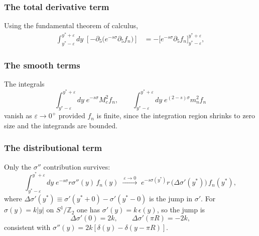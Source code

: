 \documentclass[11pt]{article}
\begin{document}
\subsubsection*{The total derivative term}
Using the fundamental theorem of calculus,
\begin{align}
\int_{y^\ast-\varepsilon}^{y^\ast+\varepsilon}\!\!dy\;
\left[-\partial_5\!\big(e^{-s\sigma}\partial_5 f_n\big)\right]
&=-\Big[e^{-s\sigma}\partial_5 f_n\Big]_{y^\ast-\varepsilon}^{y^\ast+\varepsilon},
\label{eq:jump-term}
\end{align}

\subsubsection*{The smooth terms}
The integrals
\[
\int_{y^\ast-\varepsilon}^{y^\ast+\varepsilon}\!\!dy\; e^{-s\sigma} M_c^2 f_n,
\qquad
\int_{y^\ast-\varepsilon}^{y^\ast+\varepsilon}\!\!dy\; e^{(2-s)\sigma} m_n^2 f_n
\]
vanish as $\varepsilon\to 0^+$ provided $f_n$ is finite, since the integration region shrinks to
zero size and the integrands are bounded.

\subsubsection*{The distributional term}
Only the $\sigma''$ contribution survives:
\begin{equation}
\int_{y^\ast-\varepsilon}^{y^\ast+\varepsilon}\!\!dy\; e^{-s\sigma} r\sigma''(y)\,f_n(y)
\;\xrightarrow{\ \varepsilon\to 0\ }\;
e^{-s\sigma(y^\ast)} r\,\Big(\Delta\sigma'(y^\ast)\Big)\,f_n(y^\ast),
\label{eq:sigpp-term}
\end{equation}
where $\Delta\sigma'(y^\ast)\equiv \sigma'(y^\ast+0)-\sigma'(y^\ast-0)$ is the jump in $\sigma'$.
For $\sigma(y)=k|y|$ on $S^1/\mathbb{Z}_2$ one has $\sigma'(y)=k\,\epsilon(y)$, so the jump is
\begin{equation}
\Delta\sigma'(0)=2k,\qquad \Delta\sigma'(\pi R)=-2k,
\label{eq:sigprime-jumps}
\end{equation}
consistent with $\sigma''(y)=2k[\delta(y)-\delta(y-\pi R)]$.
\end{document}
